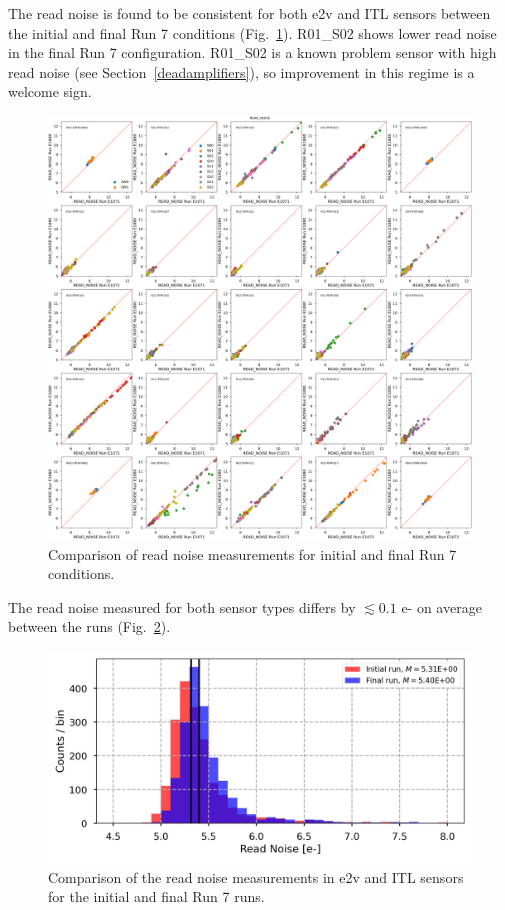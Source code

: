The read noise is found to be consistent for both e2v and ITL sensors between the initial and final Run 7 conditions (Fig.~\ref{fig:finalChar-READNoise}). R01\_S02 shows lower read noise in the final Run 7 configuration. R01\_S02 is a known problem sensor with high read noise (see Section~\ref{deadamplifiers}), so improvement in this regime is a welcome sign.

\begin{figure}[ht]
    \centering
    \includegraphics[width=0.7\linewidth]{figures/finalCharacterization/E1071_E1880_READ_NOISE_inset.png}
    \caption{Comparison of read noise measurements for initial and final Run 7 conditions.}
    \label{fig:finalChar-READNoise}
\end{figure}

The read noise measured for both sensor types differs by $\lesssim 0.1$ e- on average between the runs (Fig.~\ref{fig:finalChar:ReadNoiseByManu}).

\begin{figure}[ht]
    \centering
    \includegraphics[width=0.7\linewidth]{figures/finalCharacterization/ReadNoiseComp.jpg}
    \caption{Comparison of the read noise measurements in e2v and ITL sensors for the initial and final Run 7 runs.}
    \label{fig:finalChar:ReadNoiseByManu}
\end{figure}

